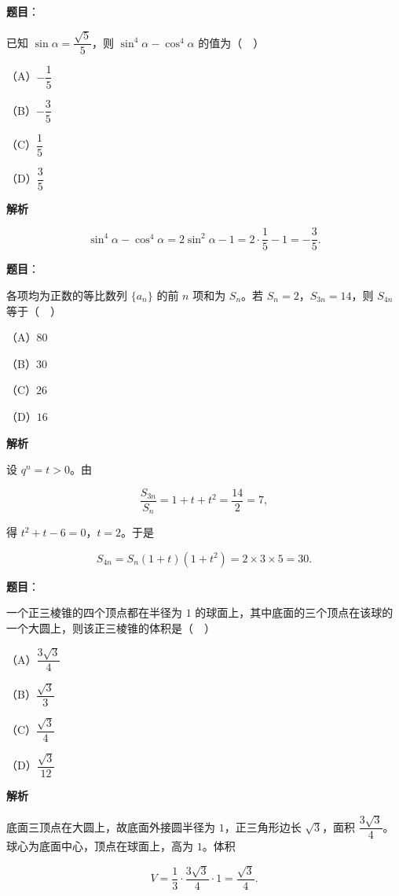 \begin{answer}

\textbf{题目}：

已知 $\sin\alpha=\dfrac{\sqrt5}{5}$，则 $\sin^4\alpha-\cos^4\alpha$ 的值为（　）

（A）$-\dfrac15$

（B）$-\dfrac35$

（C）$\dfrac15$

（D）$\dfrac35$

\textbf{解析}

\nopagebreak[4]
\[\sin^4\alpha-\cos^4\alpha=2\sin^2\alpha-1=2\cdot\frac15-1=-\frac35.\]


\end{answer}
\begin{answer}

\textbf{题目}：

各项均为正数的等比数列 $\{a_n\}$ 的前 $n$ 项和为 $S_n$。若 $S_n=2$，$S_{3n}=14$，则 $S_{4n}$ 等于（　）

（A）$80$

（B）$30$

（C）$26$

（D）$16$

\textbf{解析}

设 $q^n=t>0$。由

\nopagebreak[4]
\[\frac{S_{3n}}{S_n}=1+t+t^2=\frac{14}{2}=7,\]

得 $t^2+t-6=0$，$t=2$。于是

\nopagebreak[4]
\[S_{4n}=S_n(1+t)(1+t^2)=2\times3\times5=30.\]


\end{answer}
\begin{answer}

\textbf{题目}：

一个正三棱锥的四个顶点都在半径为 $1$ 的球面上，其中底面的三个顶点在该球的一个大圆上，则该正三棱锥的体积是（　）

（A）$\dfrac{3\sqrt3}{4}$

（B）$\dfrac{\sqrt3}{3}$

（C）$\dfrac{\sqrt3}{4}$

（D）$\dfrac{\sqrt3}{12}$

\textbf{解析}

底面三顶点在大圆上，故底面外接圆半径为 $1$，正三角形边长 $\sqrt3$，面积 $\dfrac{3\sqrt3}{4}$。球心为底面中心，顶点在球面上，高为 $1$。体积

\nopagebreak[4]
\[V=\frac13\cdot\frac{3\sqrt3}{4}\cdot1=\frac{\sqrt3}{4}.\]


\end{answer}
